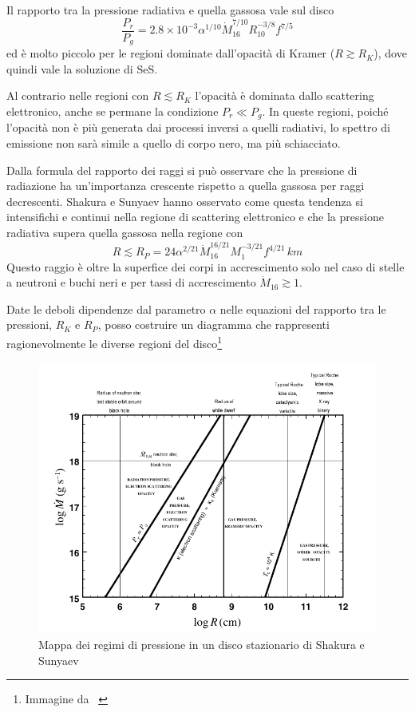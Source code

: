 \documentclass[a4paperbi]{article}
\begin{document}
	Il rapporto tra la pressione radiativa e quella gassosa vale sul disco
	\begin{equation}
		\frac{P_r}{P_g}=2.8\times10^{-3}\alpha^{1/10}\dot{M}^{7/10}_{16}R^{-3/8}_{10}f^{7/5}
	\end{equation}
ed è molto piccolo per le regioni dominate dall'opacità di Kramer ($R\gtrsim R_K$), dove quindi vale la soluzione di SeS.
	
	Al contrario nelle regioni con $R\lesssim R_K$ l'opacità è dominata dallo scattering elettronico, anche se permane la condizione $P_r\ll P_g$. In queste regioni, poiché l'opacità non è più generata dai processi inversi a quelli radiativi, lo spettro di emissione non sarà simile a quello di corpo nero, ma più schiacciato.
	
	Dalla formula del rapporto dei raggi si può osservare che la pressione di radiazione ha un'importanza crescente rispetto a quella gassosa per raggi decrescenti. Shakura e Sunyaev hanno osservato come questa tendenza si intensifichi e continui nella regione di scattering elettronico e che la pressione radiativa supera quella gassosa nella regione con
	\begin{equation}
		R\lesssim R_P=24\alpha^{2/21}\dot{M}^{16/21}_{16}M^{-3/21}_1f^{4/21}\,km
	\end{equation}
	Questo raggio è oltre la superfice dei corpi in accrescimento solo nel caso di stelle a neutroni e buchi neri e per tassi di accrescimento $\dot{M}_{16}\gtrsim 1$.
	
	Date le deboli dipendenze dal parametro $\alpha$ nelle equazioni del rapporto tra le pressioni, $R_K$ e $R_P$, posso costruire un diagramma che rappresenti ragionevolmente le diverse regioni del disco\footnote{Immagine da ~\cite{FrankKingRaineAccretionPower}}
	
	\begin{figure}[H]
		\centering
		\includegraphics[width=1\linewidth]{MappaPressione}
		\caption{Mappa dei regimi di pressione in un disco stazionario di Shakura e Sunyaev}
		\label{fig:MappaPressione}
	\end{figure}
	
\end{document}
